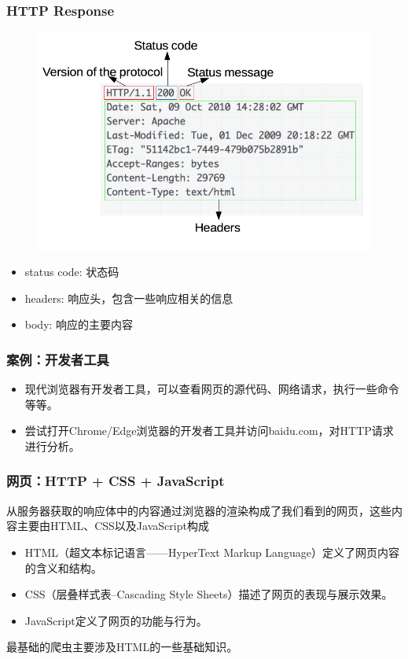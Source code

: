 \documentclass[9pt]{beamer}
\begin{document}
\begin{frame}
\frametitle{HTTP Response}
\begin{figure}
\centering
\includegraphics[height=0.5\paperheight]{figures/http_response.png}
\end{figure}

\begin{itemize}
    \item status code: 状态码
    \item headers: 响应头，包含一些响应相关的信息
    \item body: 响应的主要内容
\end{itemize}


\end{frame}

\begin{frame}
    \frametitle{案例：开发者工具}

    \begin{itemize}
        \item 现代浏览器有开发者工具，可以查看网页的源代码、网络请求，执行一些命令等等。
        \item 尝试打开Chrome/Edge浏览器的开发者工具并访问baidu.com，对HTTP请求进行分析。
    \end{itemize}

\end{frame}


\begin{frame}
    \frametitle{网页：HTTP + CSS + JavaScript}

从服务器获取的响应体中的内容通过浏览器的渲染构成了我们看到的网页，这些内容主要由HTML、CSS以及JavaScript构成

\begin{itemize}
    \item HTML（超文本标记语言——HyperText Markup Language）定义了网页内容的含义和结构。
    \item CSS（层叠样式表--Cascading Style Sheets）描述了网页的表现与展示效果。
    \item JavaScript定义了网页的功能与行为。
\end{itemize}

最基础的爬虫主要涉及HTML的一些基础知识。

\end{frame}
\end{document}
